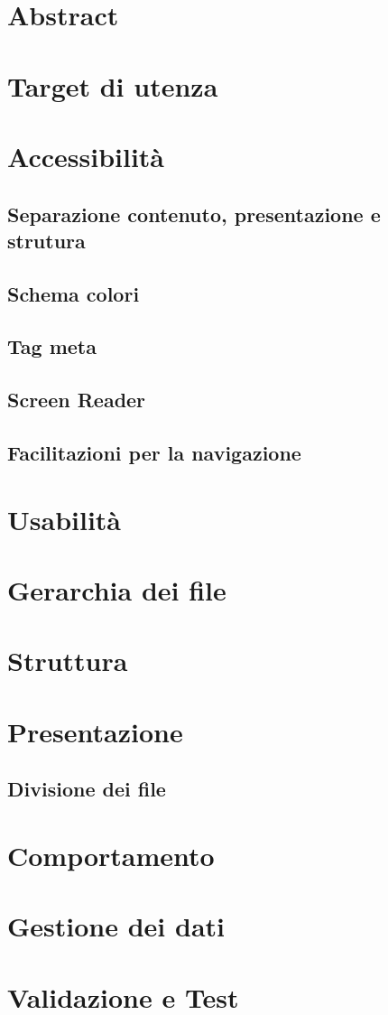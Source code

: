 \documentclass[10pt, a4paper]{article}
\theoremstyle{definition} 	%
\begin{document}
\section{Abstract}

\section{Target di utenza}

\section{Accessibilità}
	\subsection{Separazione contenuto, presentazione e strutura}
	\subsection{Schema colori}
	\subsection{Tag meta}
	\subsection{Screen Reader}
	\subsection{Facilitazioni per la navigazione}

\section{Usabilità}

\section{Gerarchia dei file}

\section{Struttura}

\section{Presentazione}
	\subsection{Divisione dei file}

\section{Comportamento}

\section{Gestione dei dati}

\section{Validazione e Test}
\end{document}
